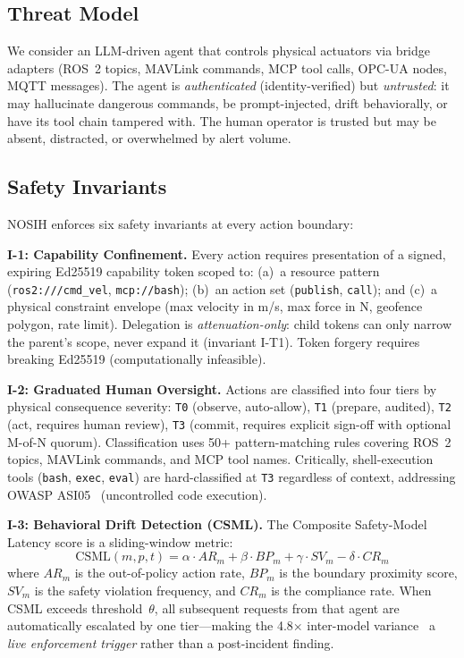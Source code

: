 \documentclass[conference]{IEEEtran}
\begin{document}
\subsection{Threat Model}

We consider an LLM-driven agent that controls physical actuators via bridge
adapters (ROS~2 topics, MAVLink commands, MCP tool calls, OPC-UA nodes, MQTT
messages).
The agent is \emph{authenticated} (identity-verified) but \emph{untrusted}:
it may hallucinate dangerous commands, be prompt-injected, drift behaviorally,
or have its tool chain tampered with.
The human operator is trusted but may be absent, distracted, or overwhelmed by
alert volume.

\subsection{Safety Invariants}

NOSIH enforces six safety invariants at every action boundary:

\textbf{I-1: Capability Confinement.}
Every action requires presentation of a signed, expiring Ed25519 capability
token scoped to: (a)~a resource pattern (\texttt{ros2:///cmd\_vel},
\texttt{mcp://bash}); (b)~an action set (\texttt{publish}, \texttt{call});
and (c)~a physical constraint envelope (max velocity in m/s, max force in N,
geofence polygon, rate limit).
Delegation is \emph{attenuation-only}: child tokens can only narrow the parent's
scope, never expand it (invariant I-T1).
Token forgery requires breaking Ed25519 (computationally infeasible).

\textbf{I-2: Graduated Human Oversight.}
Actions are classified into four tiers by physical consequence severity:
\texttt{T0} (observe, auto-allow), \texttt{T1} (prepare, audited),
\texttt{T2} (act, requires human review), \texttt{T3} (commit, requires explicit
sign-off with optional M-of-N quorum).
Classification uses 50+ pattern-matching rules covering ROS~2 topics, MAVLink
commands, and MCP tool names.
Critically, shell-execution tools (\texttt{bash}, \texttt{exec}, \texttt{eval})
are hard-classified at \texttt{T3} regardless of context, addressing OWASP
ASI05~\cite{owasp-asi} (uncontrolled code execution).

\textbf{I-3: Behavioral Drift Detection (CSML).}
The Composite Safety-Model Latency score is a sliding-window metric:
\begin{equation}
\text{CSML}(m,p,t) = \alpha\!\cdot\!AR_m + \beta\!\cdot\!BP_m + \gamma\!\cdot\!SV_m - \delta\!\cdot\!CR_m
\label{eq:csml}
\end{equation}
where $AR_m$ is the out-of-policy action rate, $BP_m$ is the boundary proximity
score, $SV_m$ is the safety violation frequency, and $CR_m$ is the compliance
rate.
When CSML exceeds threshold~$\theta$, all subsequent requests from that agent
are automatically escalated by one tier---making the 4.8$\times$ inter-model
variance~\cite{rosclaw} a \emph{live enforcement trigger} rather than a
post-incident finding.
\end{document}
